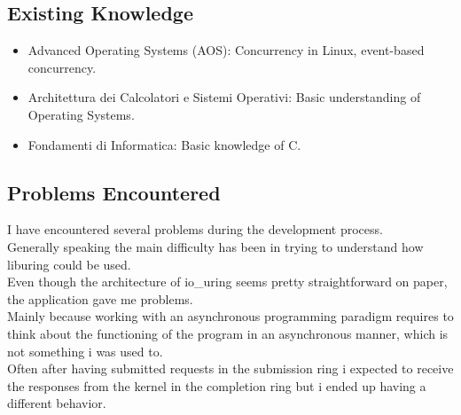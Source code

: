 \subsection{Existing Knowledge}

\begin{itemize}
    \item Advanced Operating Systems (AOS): Concurrency in Linux, event-based concurrency.
    \item Architettura dei Calcolatori e Sistemi Operativi: Basic understanding of Operating Systems.
    \item Fondamenti di Informatica: Basic knowledge of C.
\end{itemize}

\subsection{Problems Encountered}
I have encountered several problems during the development process. \\
Generally speaking the main difficulty has been in trying to understand how liburing could be used. \\
Even though the architecture of io\_uring seems pretty straightforward on paper, the application gave me problems.\\ 
Mainly because working with an asynchronous programming paradigm requires to think about the functioning of the program in an asynchronous manner, which is not something i was used to. \\
Often after having submitted requests in the submission ring i expected to receive the responses from the kernel in the completion ring but i ended up having a different behavior.

